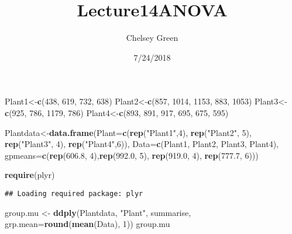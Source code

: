 \documentclass[]{article}
\title{Lecture14ANOVA}
\author{Chelsey Green}
\date{7/24/2018}
\newenvironment{Shaded}{\begin{snugshade}}{\end{snugshade}}
\newcommand{\KeywordTok}[1]{\textcolor[rgb]{0.13,0.29,0.53}{\textbf{#1}}}
\newcommand{\DataTypeTok}[1]{\textcolor[rgb]{0.13,0.29,0.53}{#1}}
\newcommand{\DecValTok}[1]{\textcolor[rgb]{0.00,0.00,0.81}{#1}}
\newcommand{\FloatTok}[1]{\textcolor[rgb]{0.00,0.00,0.81}{#1}}
\newcommand{\StringTok}[1]{\textcolor[rgb]{0.31,0.60,0.02}{#1}}
\newcommand{\NormalTok}[1]{#1}
\begin{document}
\maketitle

\begin{Shaded}
\begin{Highlighting}[]
\NormalTok{Plant1<-}\KeywordTok{c}\NormalTok{(}\DecValTok{438}\NormalTok{, }\DecValTok{619}\NormalTok{, }\DecValTok{732}\NormalTok{, }\DecValTok{638}\NormalTok{)}
\NormalTok{Plant2<-}\KeywordTok{c}\NormalTok{(}\DecValTok{857}\NormalTok{, }\DecValTok{1014}\NormalTok{, }\DecValTok{1153}\NormalTok{, }\DecValTok{883}\NormalTok{, }\DecValTok{1053}\NormalTok{)}
\NormalTok{Plant3<-}\KeywordTok{c}\NormalTok{(}\DecValTok{925}\NormalTok{, }\DecValTok{786}\NormalTok{, }\DecValTok{1179}\NormalTok{, }\DecValTok{786}\NormalTok{)}
\NormalTok{Plant4<-}\KeywordTok{c}\NormalTok{(}\DecValTok{893}\NormalTok{, }\DecValTok{891}\NormalTok{, }\DecValTok{917}\NormalTok{, }\DecValTok{695}\NormalTok{, }\DecValTok{675}\NormalTok{, }\DecValTok{595}\NormalTok{)}

\NormalTok{Plantdata<-}\KeywordTok{data.frame}\NormalTok{(}\DataTypeTok{Plant=}\KeywordTok{c}\NormalTok{(}\KeywordTok{rep}\NormalTok{(}\StringTok{"Plant1"}\NormalTok{,}\DecValTok{4}\NormalTok{), }\KeywordTok{rep}\NormalTok{(}\StringTok{"Plant2"}\NormalTok{, }\DecValTok{5}\NormalTok{), }\KeywordTok{rep}\NormalTok{(}\StringTok{"Plant3"}\NormalTok{, }\DecValTok{4}\NormalTok{), }\KeywordTok{rep}\NormalTok{(}\StringTok{"Plant4"}\NormalTok{,}\DecValTok{6}\NormalTok{)), }\DataTypeTok{Data=}\KeywordTok{c}\NormalTok{(Plant1, Plant2, Plant3, Plant4), }\DataTypeTok{gpmeans=}\KeywordTok{c}\NormalTok{(}\KeywordTok{rep}\NormalTok{(}\FloatTok{606.8}\NormalTok{, }\DecValTok{4}\NormalTok{),}\KeywordTok{rep}\NormalTok{(}\FloatTok{992.0}\NormalTok{, }\DecValTok{5}\NormalTok{), }\KeywordTok{rep}\NormalTok{(}\FloatTok{919.0}\NormalTok{, }\DecValTok{4}\NormalTok{), }\KeywordTok{rep}\NormalTok{(}\FloatTok{777.7}\NormalTok{, }\DecValTok{6}\NormalTok{)))}

\KeywordTok{require}\NormalTok{(plyr)}
\end{Highlighting}
\end{Shaded}

\begin{verbatim}
## Loading required package: plyr
\end{verbatim}

\begin{Shaded}
\begin{Highlighting}[]
\NormalTok{group.mu <-}\StringTok{ }\KeywordTok{ddply}\NormalTok{(Plantdata, }\StringTok{"Plant"}\NormalTok{, summarise, }\DataTypeTok{grp.mean=}\KeywordTok{round}\NormalTok{(}\KeywordTok{mean}\NormalTok{(Data), }\DecValTok{1}\NormalTok{))}
\NormalTok{group.mu}
\end{Highlighting}
\end{Shaded}
\end{document}
